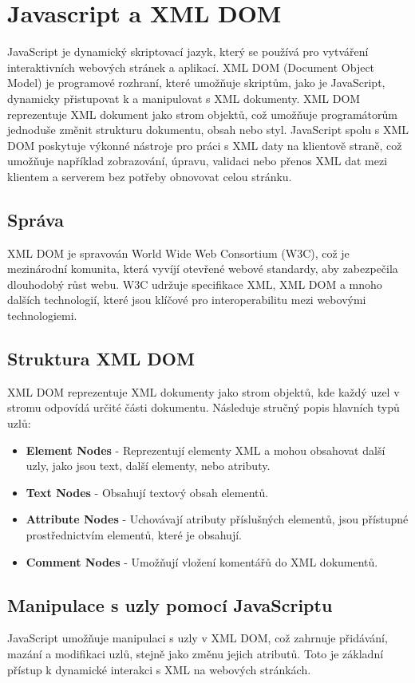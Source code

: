 \chapter{Javascript a XML DOM} %
\label{cha:Javascript_a_XML_DOM}

JavaScript je dynamický skriptovací jazyk, který se používá pro vytváření interaktivních webových stránek a aplikací. XML DOM (Document Object Model) je programové rozhraní, které umožňuje skriptům, jako je JavaScript, dynamicky přistupovat k a manipulovat s XML dokumenty. XML DOM reprezentuje XML dokument jako strom objektů, což umožňuje programátorům jednoduše změnit strukturu dokumentu, obsah nebo styl. JavaScript spolu s XML DOM poskytuje výkonné nástroje pro práci s XML daty na klientově straně, což umožňuje například zobrazování, úpravu, validaci nebo přenos XML dat mezi klientem a serverem bez potřeby obnovovat celou stránku.

\section{Správa}
XML DOM je spravován World Wide Web Consortium (W3C), což je mezinárodní komunita, která vyvíjí otevřené webové standardy, aby zabezpečila dlouhodobý růst webu. W3C udržuje specifikace XML, XML DOM a mnoho dalších technologií, které jsou klíčové pro interoperabilitu mezi webovými technologiemi.

\section{Struktura XML DOM}

XML DOM reprezentuje XML dokumenty jako strom objektů, kde každý uzel v stromu odpovídá určité části dokumentu. Následuje stručný popis hlavních typů uzlů:

\begin{itemize}
  \item \textbf{Element Nodes} - Reprezentují elementy XML a mohou obsahovat další uzly, jako jsou text, další elementy, nebo atributy.
  \item \textbf{Text Nodes} - Obsahují textový obsah elementů.
  \item \textbf{Attribute Nodes} - Uchovávají atributy příslušných elementů, jsou přístupné prostřednictvím elementů, které je obsahují.
  \item \textbf{Comment Nodes} - Umožňují vložení komentářů do XML dokumentů.
\end{itemize}

\section{Manipulace s uzly pomocí JavaScriptu}

JavaScript umožňuje manipulaci s uzly v XML DOM, což zahrnuje přidávání, mazání a modifikaci uzlů, stejně jako změnu jejich atributů. Toto je základní přístup k dynamické interakci s XML na webových stránkách.

